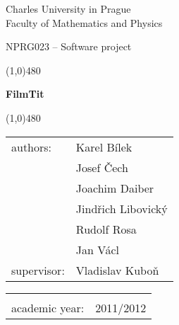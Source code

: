 \begin{titlepage}
\begin{center}
\sc \Large Charles University in Prague \\
Faculty of Mathematics and Physics
\end{center}

\vspace{0.5cm}

\begin{center}
\huge NPRG023 -- Software project
\end{center}

\vspace{1.5cm}

\noindent\line(1,0){480}

\vspace{0.3cm}

\begin{center}
\hfill\fontsize{40mm}{40mm}\bf\sf FilmTit
\end{center}

\noindent\line(1,0){480}

\vspace{5.25cm}

{\noindent\Large
\begin{tabular}{ll}
authors: & Karel Bílek \\
& Josef Čech \\
& Joachim Daiber \\
& Jindřich Libovický \\
& Rudolf Rosa \\
& Jan Václ\vspace*{0.4cm} \\
supervisor: & Vladislav Kuboň
\end{tabular}
\hfill\begin{tabular}{ll}
\vspace*{3.4cm}& \\
academic year: & 2011/2012\\
\end{tabular}}


\end{titlepage}
